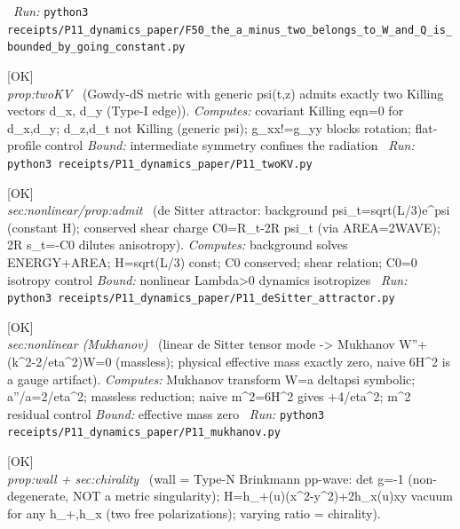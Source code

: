\begin{description}
\ \emph{Run:} \texttt{python3 receipts/P11\_dynamics\_paper/F50\_the\_a\_minus\_two\_belongs\_to\_W\_and\_Q\_is\_bounded\_by\_going\_constant.py}
\item[\rcptlabel{P11_twoKV}{P11R3}\textbf{P11R3}\quad\texttt{P11\_twoKV}]\hfill\textsf{[OK]}\\
\textit{prop:twoKV} \ (Gowdy-dS metric with generic psi(t,z) admits exactly two Killing vectors d\_x, d\_y (Type-I edge)). 
\emph{Computes:} covariant Killing eqn=0 for d\_x,d\_y; d\_z,d\_t not Killing (generic psi); g\_xx!=g\_yy blocks rotation; flat-profile control
 \emph{Bound:} intermediate symmetry confines the radiation
\ \emph{Run:} \texttt{python3 receipts/P11\_dynamics\_paper/P11\_twoKV.py}
\item[\rcptlabel{P11_deSitter_attractor}{P11R4}\textbf{P11R4}\quad\texttt{P11\_deSitter\_attractor}]\hfill\textsf{[OK]}\\
\textit{sec:nonlinear/prop:admit} \ (de Sitter attractor: background psi\_t=sqrt(L/3)e\textasciicircum{}psi (constant H); conserved shear charge C0=R\_t-2R psi\_t (via AREA=2WAVE); 2R s\_t=-C0 dilutes anisotropy). 
\emph{Computes:} background solves ENERGY+AREA; H=sqrt(L/3) const; C0 conserved; shear relation; C0=0 isotropy control
 \emph{Bound:} nonlinear Lambda>0 dynamics isotropizes
\ \emph{Run:} \texttt{python3 receipts/P11\_dynamics\_paper/P11\_deSitter\_attractor.py}
\item[\rcptlabel{P11_mukhanov}{P11R5}\textbf{P11R5}\quad\texttt{P11\_mukhanov}]\hfill\textsf{[OK]}\\
\textit{sec:nonlinear (Mukhanov)} \ (linear de Sitter tensor mode -> Mukhanov W''+(k\textasciicircum{}2-2/eta\textasciicircum{}2)W=0 (massless); physical effective mass exactly zero, naive 6H\textasciicircum{}2 is a gauge artifact). 
\emph{Computes:} Mukhanov transform W=a deltapsi symbolic; a''/a=2/eta\textasciicircum{}2; massless reduction; naive m\textasciicircum{}2=6H\textasciicircum{}2 gives +4/eta\textasciicircum{}2; m\textasciicircum{}2 residual control
 \emph{Bound:} effective mass zero
\ \emph{Run:} \texttt{python3 receipts/P11\_dynamics\_paper/P11\_mukhanov.py}
\item[\rcptlabel{P11_wall_ppwave}{P11R6}\textbf{P11R6}\quad\texttt{P11\_wall\_ppwave}]\hfill\textsf{[OK]}\\
\textit{prop:wall + sec:chirality} \ (wall = Type-N Brinkmann pp-wave: det g=-1 (non-degenerate, NOT a metric singularity); H=h\_+(u)(x\textasciicircum{}2-y\textasciicircum{}2)+2h\_x(u)xy vacuum for any h\_+,h\_x (two free polarizations); varying ratio = chirality). 

\end{description}
